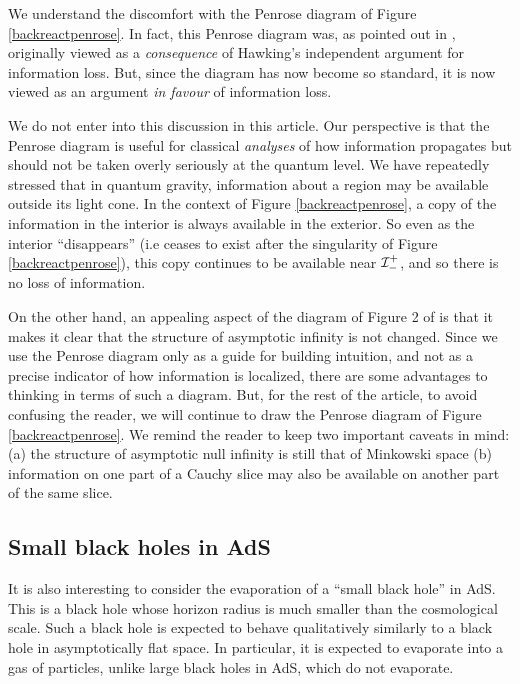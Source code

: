 \documentclass[12pt]{article}
\def \scrippast{{\cal I}^{+}_{-}}
\begin{document}
We understand the discomfort with the Penrose diagram of Figure \ref{backreactpenrose}. In fact, this Penrose diagram was, as pointed out in  \cite{Ashtekar:2020ifw}, originally viewed as a {\em consequence} of Hawking's independent argument for information loss. But, since the diagram has now become so standard, it is now viewed as an argument {\em in favour} of information loss.

We do not enter into this discussion in this article. Our perspective is that the Penrose diagram is useful for classical {\em analyses} of how information propagates but should not be taken overly seriously at the quantum level.
We have repeatedly stressed that in quantum gravity, information about a region may be available outside its light cone.
In the context of Figure \ref{backreactpenrose}, a copy of the information in the interior is always available in the exterior. So even as the interior ``disappears'' (i.e ceases to exist after the singularity of Figure \ref{backreactpenrose}), this copy continues to be available near $\scrippast$, and so there is no loss of information.

On the other hand, an appealing aspect of the diagram of Figure 2 of \cite{Ashtekar:2020ifw}  is that it makes it clear that the structure of asymptotic infinity is not changed. Since we  use the Penrose diagram only as a guide for building intuition, and not as a precise indicator
of how information is localized, there are some advantages to thinking in terms of such a diagram.  But, for the rest of the article, to avoid confusing the reader, we will continue to draw the Penrose diagram of Figure \ref{backreactpenrose}. We remind the reader to keep two important caveats in mind: (a) the structure of asymptotic null infinity is still that of Minkowski space (b) information on one part of a Cauchy slice may also be available on another part of the same slice.




\subsection{Small black holes in AdS}


It is also interesting to consider the  evaporation of a ``small black hole'' in AdS. This is a black hole whose horizon radius is much smaller than the cosmological scale. Such a black hole is expected to behave qualitatively similarly to a black hole in asymptotically flat space. In particular, it is expected to evaporate into a gas of particles, unlike large black holes in AdS, which do not evaporate.
\end{document}
